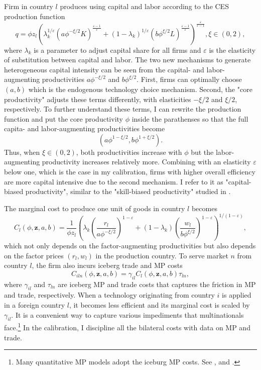 \documentclass[notitlepage,11pt]{article}%
\begin{document}
Firm in country $l$ produces using capital and labor according to the CES
production function%
\[
q=\phi z_{l}\left(  \lambda_{k}^{1/\varepsilon}\left(  a\phi^{-\xi/2}K\right)
^{\frac{\varepsilon-1}{\varepsilon}}+\left(  1-\lambda_{k}\right)
^{1/\varepsilon}\left(  b\phi^{\xi/2}L\right)  ^{\frac{\varepsilon
-1}{\varepsilon}}\right)  ^{\frac{\varepsilon}{\varepsilon-1}},\xi\in\left(
0,2\right)  ,
\]
where $\lambda_{k}$ is a parameter to adjust capital share for all firms and
$\varepsilon$ is the elasticity of substitution between capital and labor. The
two new mechanisms to generate heterogeneous capital intensity can be seen
from the capital- and labor-augmenting productivities $a\phi^{-\xi/2}$ and
$b\phi^{\xi/2}$. First, firms can optimally choose $\left(  a,b\right)  $
which is the endogenous technology choice mechanism. Second, the "core
productivity" adjusts these terms differently, with elasticities $-\xi/2$ and
$\xi/2$, respectively. To further understand these terms, I can rewrite the
production function and put the core productivity $\phi$ inside the
parathenses so that the full capita- and labor-augmenting productivities
become%
\begin{equation}
\left(  a\phi^{1-\xi/2},b\phi^{1+\xi/2}\right)  . \label{full_factor_aug_prod}%
\end{equation}
Thus, when $\xi\in\left(  0,2\right)  $, both productivities increase with
$\phi$ but the labor-augmenting productivity increases relatively more.
Combining with an elasticity $\varepsilon$ below one, which is the case in my
calibration, firms with higher overall efficiency are more capital intensive
due to the second mechanism. I refer to it as "capital-biased productivity",
similar to the "skill-biased productivity" studied in
\cite{burstein_international_2015}.

The marginal cost to produce one unit of goods in country $l$ becomes%
\[
C_{l}\left(  \phi,\mathbf{z},a,b\right)  =\frac{1}{\phi z_{l}}\left(
\lambda_{k}\left(  \frac{r_{l}}{a\phi^{-\xi/2}}\right)  ^{1-\varepsilon
}+\left(  1-\lambda_{k}\right)  \left(  \frac{w_{l}}{b\phi^{\xi/2}}\right)
^{1-\varepsilon}\right)  ^{1/\left(  1-\varepsilon\right)  },
\]
which not only depends on the factor-augmenting productivities but also
depends on the factor prices $\left(  r_{l},w_{l}\right)  $ in the production
country. To serve market $n$ from country $l$, the firm also incurs iceberg
trade and MP costs%
\[
C_{iln}\left(  \phi,\mathbf{z},a,b\right)  =\gamma_{il}C_{l}\left(
\phi,\mathbf{z},a,b\right)  \tau_{ln},
\]
where $\gamma_{il}$ and $\tau_{ln}$ are iceberg MP and trade costs that
captures the friction in MP and trade, respectively. When a technology
originating from country $i$ is applied in a foreign country $l$, it becomes
less efficient and its marginal cost is scaled by $\gamma_{il}$. It is a
convenient way to capture various impediments that multinationals
face.\footnote{Many quantitative MP models adopt the iceburg MP costs. See
\cite{arkolakis_innovation_2013}, \cite{ramondo_trade_2013} and
\cite{tintelnot_global_2014}.} In the calibration, I discipline all the
bilateral costs with data on MP and trade.
\end{document}
